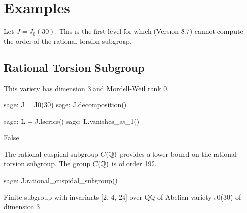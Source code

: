 \section{Examples}

Let $J=J_0(30)$. This is the first level for which \sage (Version 8.7) cannot
compute the order of the rational torsion subgroup. 

\subsection{Rational Torsion Subgroup}

This variety has dimension
3 and Mordell-Weil rank 0.
\begin{sagecode}
\begin{sagecell}
sage: J = J0(30)
sage: J.decomposition()
\end{sagecell}
\begin{sageout}
\end{sageout}
\end{sagecode}
\begin{sagecode}
\begin{sagecell}
sage: L = J.lseries()
sage: L.vanishes_at_1()
\end{sagecell}
\begin{sageout}
False
\end{sageout}
\end{sagecode}

The rational cuspidal subgroup $C(\mathbb{Q})$ provides a lower bound on the rational
torsion subgroup. The group $C(\mathbb{Q})$ is of order 192.
\begin{sagecode}
\begin{sagecell}
sage: J.rational_cuspidal_subgroup()
\end{sagecell}
\begin{sageout}
Finite subgroup with invariants [2, 4, 24] over QQ of Abelian variety J0(30) of dimension 3
\end{sageout}
\end{sagecode}

